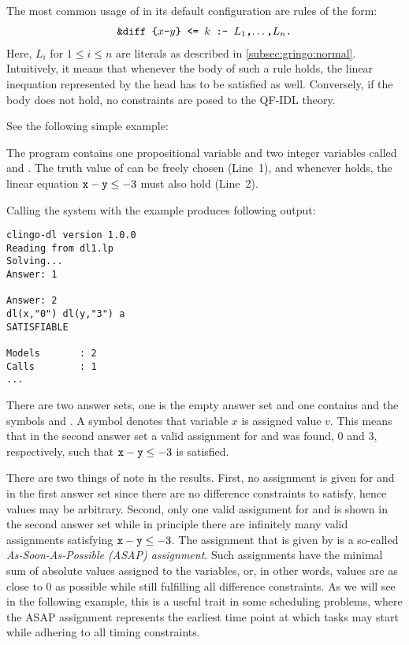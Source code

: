 The most common usage of  in its default configuration are rules of the form:
  \begin{align*}
    \texttt{\&diff\text{ }\{$x$-$y$\}\text{ }<=\text{ }$k$ :- $L_1$,$\dots$,$L_n$.}
  \end{align*}
Here, $L_i$ for $1\leq i \leq n$ are literals as described in \ref{subsec:gringo:normal}.
Intuitively, it means that whenever the body of such a rule holds, 
the linear inequation represented by the head has to be satisfied as well.
Conversely, if the body does not hold, no constraints are posed to the QF-IDL theory.
\begin{example}\label{ex:dl:simple}
         See the following simple example:
         
The program contains one propositional variable  and two integer variables called  and .
The truth value of  can be freely chosen (Line~1),
and whenever  holds, the linear equation $\texttt{x}-\texttt{y}\leq -3$ must also hold (Line~2).

Calling the system with the example produces following output:
\begin{lstlisting}[numbers=none]
clingo-dl version 1.0.0
Reading from dl1.lp
Solving...
Answer: 1

Answer: 2
dl(x,"0") dl(y,"3") a
SATISFIABLE

Models       : 2
Calls        : 1
...
\end{lstlisting}
There are two answer sets, one is the empty answer set and one contains  and the symbols  and .
A symbol  denotes that variable $x$ is assigned value $v$.
This means that in the second answer set a valid assignment for  and  was found,
0 and 3, respectively, such that $\texttt{x}-\texttt{y}\leq -3$ is satisfied.

There are two things of note in the results.
First, no assignment is given for  and  in the first answer set since there are no difference constraints to satisfy,
hence values may be arbitrary.
Second, only one valid assignment for  and  is shown in the second answer set 
while in principle there are infinitely many valid assignments satisfying $\texttt{x}-\texttt{y}\leq -3$.
The assignment that is given by  is a so-called \emph{As-Soon-As-Possible (ASAP) assignment}.
Such assignments have the minimal sum of absolute values assigned to the variables,
or, in other words, values are as close to 0 as possible while still fulfilling all difference constraints.
As we will see in the following example, this is a useful trait in some scheduling problems,
where the ASAP assignment represents the earliest time point at which tasks may start while adhering to all timing constraints.

 \end{example}



